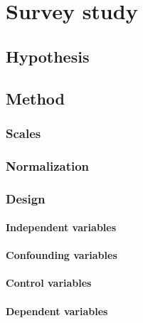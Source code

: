 \chapter{Survey study}

\section{Hypothesis}

\section{Method}
\subsection{Scales}

\subsection{Normalization}

\subsection{Design}
\subsubsection{Independent variables}
\subsubsection{Confounding variables}
\subsubsection{Control variables}
\subsubsection{Dependent variables}

